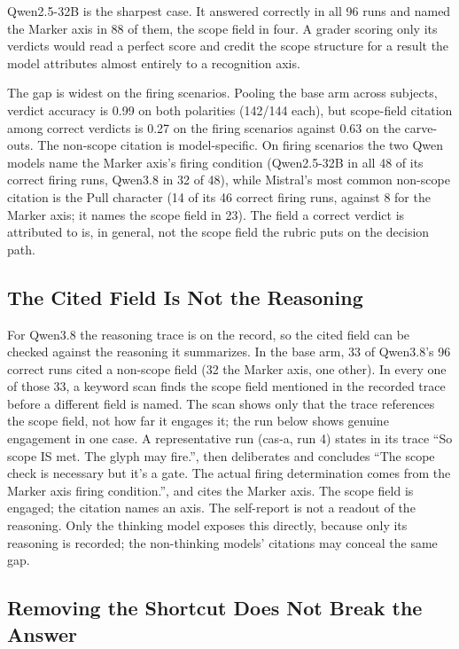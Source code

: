 \documentclass[11pt,a4paper]{article}
\begin{document}
Qwen2.5-32B is the sharpest case. It answered correctly in all 96 runs and named
the Marker axis in 88 of them, the scope field in four. A grader scoring only its
verdicts would read a perfect score and credit the scope structure for a result
the model attributes almost entirely to a recognition axis.

The gap is widest on the firing scenarios. Pooling the base arm across subjects,
verdict accuracy is 0.99 on both polarities (142/144 each), but scope-field
citation among correct verdicts is 0.27 on the firing scenarios against 0.63 on
the carve-outs. The non-scope citation is model-specific. On firing scenarios the
two Qwen models name the Marker axis's firing condition (Qwen2.5-32B in all 48 of
its correct firing runs, Qwen3.8 in 32 of 48), while Mistral's most common non-scope
citation is the Pull character (14 of its 46 correct firing runs, against 8 for the
Marker axis; it names the scope field in 23). The field a correct verdict is attributed to is, in
general, not the scope field the rubric puts on the decision path.

\subsection{The Cited Field Is Not the Reasoning}

For Qwen3.8 the reasoning trace is on the record, so the cited field can be checked
against the reasoning it summarizes. In the base arm, 33 of Qwen3.8's 96 correct
runs cited a non-scope field (32 the Marker axis, one other). In every one of those
33, a keyword scan finds the scope field mentioned in the recorded trace before a
different field is named. The scan shows only that the trace references the scope
field, not how far it engages it; the run below shows genuine engagement in one
case. A representative run (cas-a, run 4) states in its trace ``So scope IS met. The glyph
may fire.'', then deliberates and concludes ``The scope check is necessary but it's
a gate. The actual firing determination comes from the Marker axis firing
condition.'', and cites the Marker axis. The scope field is engaged; the citation
names an axis. The self-report is not a readout of the reasoning. Only the thinking
model exposes this directly, because only its reasoning is recorded; the
non-thinking models' citations may conceal the same gap.

\subsection{Removing the Shortcut Does Not Break the Answer}
\end{document}
